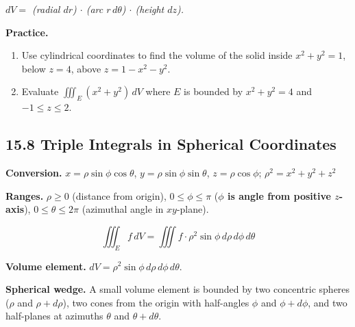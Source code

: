 \documentclass[12pt]{article}
\theoremstyle{compact}
\begin{document}
\textit{$dV=$ (radial $dr$) $\cdot$ (arc $r\,d\theta$) $\cdot$ (height $dz$).}

\medskip\textbf{Practice.}
\begin{enumerate}[noitemsep]
  \item Use cylindrical coordinates to find the volume of the solid inside $x^2+y^2=1$, below $z=4$, above $z=1-x^2-y^2$.
  \item Evaluate $\iiint_E(x^2+y^2)\,dV$ where $E$ is bounded by $x^2+y^2=4$ and $-1\le z\le2$.
\end{enumerate}

\subsection{15.8 Triple Integrals in Spherical Coordinates}

\textbf{Conversion.} $x=\rho\sin\phi\cos\theta$, $y=\rho\sin\phi\sin\theta$, $z=\rho\cos\phi$; \quad $\rho^2=x^2+y^2+z^2$

\textbf{Ranges.} $\rho\ge0$ (distance from origin), $0\le\phi\le\pi$ (\textbf{$\phi$ is angle from positive $z$-axis}), $0\le\theta\le2\pi$ (azimuthal angle in $xy$-plane).

\[
\iiint_E f\,dV = \iiint f\cdot\rho^2\sin\phi\,d\rho\,d\phi\,d\theta
\]

\textbf{Volume element.} $dV = \rho^2\sin\phi\,d\rho\,d\phi\,d\theta$.

\begin{center}
\end{center}

\textbf{Spherical wedge.} A small volume element is bounded by two concentric spheres ($\rho$ and $\rho+d\rho$), two cones from the origin with half-angles $\phi$ and $\phi+d\phi$, and two half-planes at azimuths $\theta$ and $\theta+d\theta$.
\end{document}
